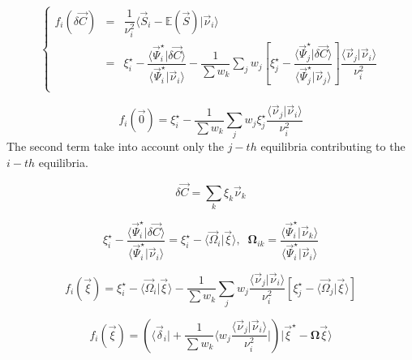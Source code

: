 \documentclass[aps,12pt]{revtex4}
\begin{document}
\begin{equation}
\left\lbrace
\begin{array}{rcl}
	f_i(\delta\vec{C}) &=& \dfrac{1}{\nu_i^2} \langle \vec{S}_i - \mathbb{E}(\vec{S}) \vert \vec{\nu}_i \rangle\\
	 & = &
	 \displaystyle \xi_i^\star - \dfrac{\langle \vec{\Psi}_i^\star \vert \delta\vec{C} \rangle}{\langle \vec{\Psi}_i^\star \vert \vec{\nu}_i \rangle
}
-
\dfrac{1}{\sum w_k}\sum_j w_j\left[ \xi_j^\star - \dfrac{\langle \vec{\Psi}_j^\star \vert \delta\vec{C} \rangle}{\langle \vec{\Psi}_j^\star \vert \vec{\nu}_j \rangle
}\right] \dfrac{\langle\vec{\nu}_j\vert\vec{\nu}_i\rangle}{\nu_i^2}\\
\end{array}
\right.
\end{equation} 

\begin{equation}
	f_i(\vec{0}) = \xi_i^\star - \dfrac{1}{\sum w_k}\sum_j w_j  \xi_j^\star \dfrac{\langle\vec{\nu}_j\vert\vec{\nu}_i\rangle}{\nu_i^2}
\end{equation}
The second term take into account only the $j-th$ equilibria contributing to the $i-th$ equilibria.

\begin{equation}
\delta\vec{C} = \sum_k \xi_k \vec{\nu}_k
\end{equation}

\begin{equation}
\xi_i^\star - \dfrac{\langle \vec{\Psi}_i^\star \vert \delta\vec{C} \rangle}{\langle \vec{\Psi}_i^\star \vert \vec{\nu}_i \rangle}
= \xi_i^\star - \langle\vec{\Omega}_i \vert \vec{\xi}\rangle,
\;\; \bm{\Omega}_{ik} = \dfrac{\langle \vec{\Psi}_i^\star \vert \vec{\nu}_k \rangle}{\langle \vec{\Psi}_i^\star \vert \vec{\nu}_i \rangle}
\end{equation}

\begin{equation}
	f_i(\vec{\xi}) =  \xi_i^\star - \langle\vec{\Omega}_i \vert \vec{\xi}\rangle - 
	\dfrac{1}{\sum w_k}
	\sum_j w_j
	\dfrac{\langle\vec{\nu}_j\vert\vec{\nu}_i\rangle}{\nu_i^2}
	\left[\xi_j^\star - \langle\vec{\Omega}_j \vert \vec{\xi}\rangle \right]
\end{equation}

\begin{equation}
	f_i(\vec{\xi}) = 
	\left( \langle \vec{\delta}_i \vert 
	+\dfrac{1}{\sum w_k}\langle  w_j
	\dfrac{\langle\vec{\nu}_j\vert\vec{\nu}_i\rangle}{\nu_i^2} \vert \right) 
	\vert \vec{\xi}^\star - \bm{\Omega} \vec{\xi} \rangle
\end{equation}
\end{document}

